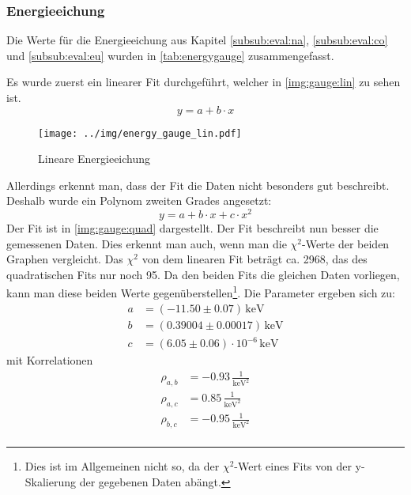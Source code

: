 \subsubsection{Energieeichung}
Die Werte für die Energieeichung aus Kapitel \ref{subsub:eval:na}, \ref{subsub:eval:co} und \ref{subsub:eval:eu} wurden in 
\autoref{tab:energygauge} zusammengefasst.

Es wurde zuerst ein linearer Fit durchgeführt, welcher in \autoref{img:gauge:lin} zu sehen ist.
\begin{equation}
  y = a + b\cdot x
\end{equation}
\label{subsub:energygauge}
\begin{figure}[H]
\begin{center}
  \texttt{[image: ../img/energy\_gauge\_lin.pdf]}
  \caption{Lineare Energieeichung}
  \label{img:gauge:lin}
\end{center}
\end{figure}
Allerdings erkennt man, dass der Fit die Daten nicht besonders gut beschreibt. Deshalb wurde ein Polynom zweiten Grades angesetzt:
\begin{equation}
  y = a + b\cdot x + c\cdot x^2
\end{equation}
Der Fit ist in \autoref{img:gauge:quad} dargestellt. Der Fit beschreibt nun besser die gemessenen Daten. Dies erkennt man auch, 
wenn man die $\chi^2$-Werte der beiden Graphen vergleicht. Das $\chi^2$ von dem linearen Fit beträgt ca. 2968, das des quadratischen Fits 
nur noch 95. Da den beiden Fits die gleichen Daten vorliegen, kann man diese beiden Werte gegenüberstellen\footnote{Dies ist im Allgemeinen nicht so,
da der $\chi^2$-Wert eines Fits von der y-Skalierung der gegebenen Daten abängt.}.
Die Parameter ergeben sich zu:
\begin{equation}
\begin{split}
  \label{eq:energygauge:params}
  a &= (-11.50 \pm 0.07) \,\text{keV} \\
  b &= (0.39004 \pm 0.00017) \,\text{keV} \\
  c &= (6.05 \pm 0.06) \cdot 10^{-6} \,\text{keV}
\end{split}
\end{equation}
mit Korrelationen
\begin{equation}
\begin{split}
  \label{eq:energygauge:corr}
  \rho_{a, b} &= -0.93 \, \frac{1}{\text{keV}^2} \\
  \rho_{a, c} &=  0.85 \, \frac{1}{\text{keV}^2} \\
  \rho_{b, c} &= -0.95 \, \frac{1}{\text{keV}^2} \\
\end{split}
\end{equation}
